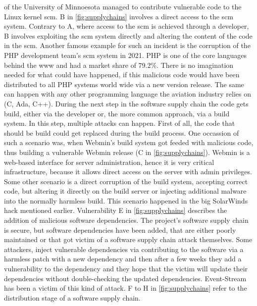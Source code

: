 \documentclass[titlepage]{report}
\begin{document}
of the University of Minnoesota managed to contribute vulnerable code to the Linux kernel \gls{scm}\cite{LinuxVulnerability}\cite{GoogleSecurityBlog}. B in \autoref{fig:supplychains} involves a direct access to the \gls{scm} system. Contrary to A, where
access to the \gls{scm} is achieved through a developer, B involves exploiting the \gls{scm} system directly and altering the content of the code in the \gls{scm}. Another famous example for such an incident is the corruption
of the PHP development team's \gls{scm} system in 2021\cite{PHPVulnerability}\cite{GoogleSecurityBlog}. PHP is one of the core languages behind the \gls{www} and had a market share of 79.2\%\cite{PHPUsage}. There is no imagination needed for what could have
happened, if this malicious code would have been distributed to all PHP systems world wide via a new version release. The same can happen with any other programming language the aviation industry relies on (C, Ada, C++\cite{LanguagesInAerospace}).
During the next step in the software supply chain the code gets build, either via the developer or, the more common approach, via a build system. In this step, multiple attacks can happen. First of all, the code that should be build
could get replaced during the build process. One occassion of such a scenario was, when Webmin's build system got feeded with malicious code, thus building a vulnerable Webmin release (C in \autoref{fig:supplychains})\cite{WebminVulnerability}\cite{GoogleSecurityBlog}. 
Webmin is a web-based interface for server administration, hence it is very critical infrastructure, because it allows direct access on the server with admin privileges. Some other scenario is a direct corruption of the build system, accepting correct code, but altering it
directly on the build server or injecting additional malware into the normally harmless build. This scenario happened in the big SolarWinds hack mentioned earlier\cite{Sunspot}\cite{GoogleSecurityBlog}. Vulnerability E in \autoref{fig:supplychains} describes
the addition of malicious software dependencies. The project's software supply chain is secure, but software dependencies have been added, that are either poorly maintained or that got victim of a software supply chain attack themselves. Some attackers,
inject vulnerable dependencies via contributing to the software via a harmless patch with a new dependency and then after a few weeks they add a vulnerability to the dependency and they hope that the victim will update their dependencies without
double-checking the updated dependencies. Event-Stream has been a victim of this kind of attack\cite{EventStream}\cite{GoogleSecurityBlog}. F to H in \autoref{fig:supplychains} refer to the distribution stage of a software supply chain.
\end{document}
